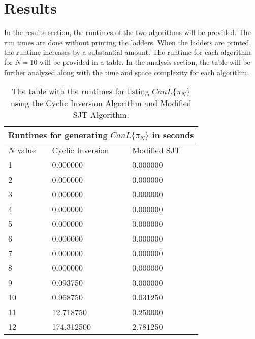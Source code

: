 

\section{Results}
    In the results section, the runtimes of the two algorithms will be provided. The run times are done without printing the ladders. When the ladders are printed, the runtime increases by a substantial amount. 
    The runtime for each algorithm for $N=10$ will be provided in a table. In the analysis section, the table will be further analyzed along with 
    the time and space complexity for each algorithm.
\begin{table}
    \begin{tabular}{ |p{3cm}||p{3cm}|p{3cm}|}
        \hline
        \multicolumn{3}{|c|}{Runtimes for generating $CanL\{\pi_{N}\}$ in seconds} \\
        \hline
            $N$ value& Cyclic Inversion & Modified SJT\\
        \hline
            1   & 0.000000    &0.000000\\
            \hline
            2 &   0.000000  & 0.000000\\

            \hline
            3 &0.000000 & 0.000000\\
            \hline
            4 &0.000000 & 0.000000\\
            \hline
            5 &   0.000000  & 0.000000\\
            \hline
            6 & 0.000000  & 0.000000  \\
            \hline
            7 & 0.000000  & 0.000000\\
            \hline
            8 & 0.000000 & 0.000000\\
            \hline
            9 & 0.093750 & 0.000000\\
            \hline
            10 & 0.968750 & 0.031250\\
            \hline

            11 & 12.718750 & 0.250000\\
            \hline 
            12 & 174.312500 & 2.781250\\
        \hline
\end{tabular}
    \caption{The table with the runtimes for listing $CanL\{\pi_{N}\}$ using the Cyclic Inversion Algorithm and Modified SJT Algorithm.}
\end{table}